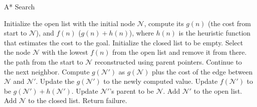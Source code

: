 \documentclass[a4paper,UKenglish,cleveref, autoref, thm-restate]{qlinhta}
\begin{document}
    \begin{algorithm}[H]
        \caption{A* Search}\label{alg:astar_search}
        \begin{algorithmic}[1]
                \State Initialize the open list with the initial node $\mathcal{N}$, compute its $g(n)$ (the cost from start to $\mathcal{N}$), and $f(n)$ ($g(n) + h(n)$), where $h(n)$ is the heuristic function that estimates the cost to the goal.
                \State Initialize the closed list to be empty.
                    \State Select the node $\mathcal{N}$ with the lowest $f(n)$ from the open list and remove it from there.
                        \Return the path from the start to $\mathcal{N}$ reconstructed using parent pointers.
                    \EndIf
                            \State Continue to the next neighbor.
                        \EndIf
                        \State Compute $g(\mathcal{N'})$ as $g(\mathcal{N})$ plus the cost of the edge between $\mathcal{N}$ and $\mathcal{N'}$.
                            \State Update the $g(\mathcal{N'})$ to the newly computed value.
                            \State Update $f(\mathcal{N'})$ to be $g(\mathcal{N'}) + h(\mathcal{N'})$.
                            \State Update $\mathcal{N'}$'s parent to be $\mathcal{N}$.
                                \State Add $\mathcal{N'}$ to the open list.
                            \EndIf
                        \EndIf
                    \EndFor
                    \State Add $\mathcal{N}$ to the closed list.
                \EndWhile
                    \State Return failure.
                \EndIf
            \EndFunction
        \end{algorithmic}
    \end{algorithm}
\end{document}
